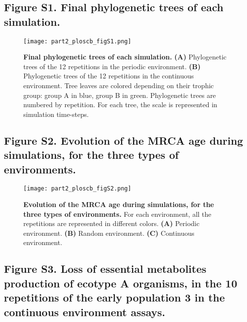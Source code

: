 

\newpage


\subsection{Figure S1. Final phylogenetic trees of each simulation.}
\label{fig:part2:first_result:S1_Fig}

\begin{figure}[!h]
\begin{center}
\texttt{[image: part2\_ploscb\_figS1.png]}
\end{center}
\caption[Final phylogenetic trees of each simulation.]{{\bf Final phylogenetic trees of each simulation.} {\bf (A)} Phylogenetic trees of the 12 repetitions in the periodic environment. {\bf (B)} Phylogenetic trees of the 12 repetitions in the continuous environment. Tree leaves are colored depending on their trophic group: group A in blue, group B in green. Phylogenetic trees are numbered by repetition. For each tree, the scale is represented in simulation time-steps.}
\end{figure}

\newpage


\subsection{Figure S2. Evolution of the MRCA age during simulations, for the three types of environments.}
\label{fig:part2:first_result:S2_Fig}

\begin{figure}[!h]
\begin{center}
\texttt{[image: part2\_ploscb\_figS2.png]}
\end{center}
\caption[Evolution of the MRCA age during simulations, for the three types of environments.]{{\bf Evolution of the MRCA age during simulations, for the three types of environments.} For each environment, all the repetitions are represented in different colors. {\bf (A)} Periodic environment. {\bf (B)} Random environment. {\bf (C)} Continuous environment.}
\end{figure}

\newpage


\subsection{Figure S3. Loss of essential metabolites production of ecotype A organisms, in the 10 repetitions of the early population 3 in the continuous environment assays.}
\label{fig:part2:first_result:S3_Fig}

